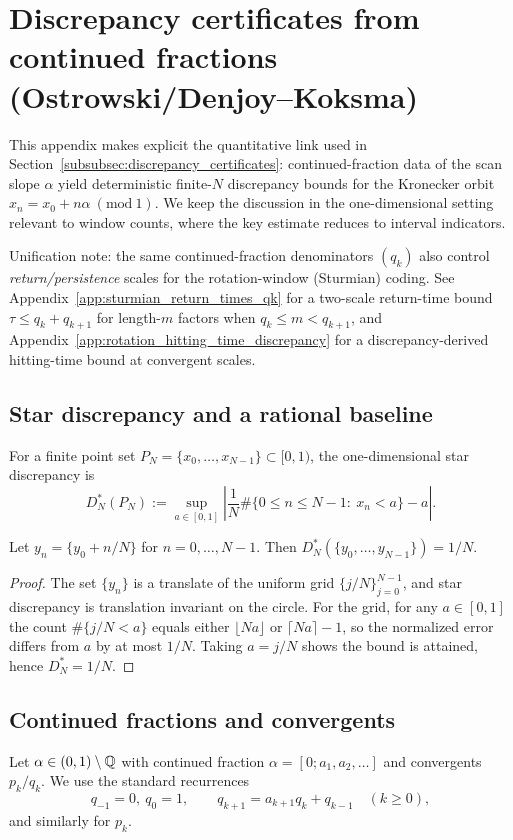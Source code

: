 \section{Discrepancy certificates from continued fractions (Ostrowski/Denjoy--Koksma)}
\label{app:discrepancy_ostrowski}
\noindent
This appendix makes explicit the quantitative link used in
Section~\ref{subsubsec:discrepancy_certificates}:
continued-fraction data of the scan slope $\alpha$ yield deterministic
finite-$N$ discrepancy bounds for the Kronecker orbit
$x_n=x_0+n\alpha\ (\mathrm{mod}\ 1)$.
We keep the discussion in the one-dimensional setting relevant to window
counts, where the key estimate reduces to interval indicators.
\par
\AuditTag Unification note: the same continued-fraction denominators $(q_k)$ also control \emph{return/persistence} scales for the rotation-window (Sturmian) coding.
See Appendix~\ref{app:sturmian_return_times_qk} for a two-scale return-time bound $\tau\le q_k+q_{k+1}$ for length-$m$ factors when $q_k\le m<q_{k+1}$, and Appendix~\ref{app:rotation_hitting_time_discrepancy} for a discrepancy-derived hitting-time bound at convergent scales.

\subsection{Star discrepancy and a rational baseline}
\label{app:discrepancy_def}
For a finite point set $P_N=\{x_0,\dots,x_{N-1}\}\subset[0,1)$, the
one-dimensional star discrepancy is
\[
D_N^\ast(P_N):=\sup_{a\in[0,1]}
\left|
\frac{1}{N}\#\{0\le n\le N-1:\ x_n<a\}-a
\right|.
\]

\begin{lemma}
\label{lem:equally_spaced_discrepancy}
Let $y_n=\{y_0+n/N\}$ for $n=0,\ldots,N-1$.
Then $D_N^\ast(\{y_0,\ldots,y_{N-1}\})=1/N$.
\end{lemma}
\begin{proof}
The set $\{y_n\}$ is a translate of the uniform grid $\{j/N\}_{j=0}^{N-1}$,
and star discrepancy is translation invariant on the circle.
For the grid, for any $a\in[0,1]$ the count
$\#\{j/N<a\}$ equals either $\lfloor Na\rfloor$ or $\lceil Na\rceil-1$,
so the normalized error differs from $a$ by at most $1/N$.
Taking $a=j/N$ shows the bound is attained, hence $D_N^\ast=1/N$.
\end{proof}

\subsection{Continued fractions and convergents}
\label{app:continued_fractions}
Let $\alpha\in(0,1)\setminus\mathbb{Q}$ with continued fraction
$\alpha=[0;a_1,a_2,\ldots]$ and convergents $p_k/q_k$.
We use the standard recurrences
\[
q_{-1}=0,\ q_0=1,\qquad q_{k+1}=a_{k+1}q_k+q_{k-1}\quad (k\ge 0),
\]
and similarly for $p_k$.

